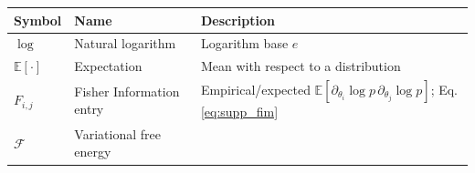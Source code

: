 \documentclass[
  10pt,
]{article}
\begin{document}
\begin{longtable}[]{@{}lll@{}}
\toprule
\begin{minipage}[b]{0.30\columnwidth}\raggedright
Symbol\strut
\end{minipage} & \begin{minipage}[b]{0.30\columnwidth}\raggedright
Name\strut
\end{minipage} & \begin{minipage}[b]{0.30\columnwidth}\raggedright
Description\strut
\end{minipage}\tabularnewline
\midrule
\endhead
\begin{minipage}[t]{0.30\columnwidth}\raggedright
\(\log\)\strut
\end{minipage} & \begin{minipage}[t]{0.30\columnwidth}\raggedright
Natural logarithm\strut
\end{minipage} & \begin{minipage}[t]{0.30\columnwidth}\raggedright
Logarithm base \(e\)\strut
\end{minipage}\tabularnewline
\begin{minipage}[t]{0.30\columnwidth}\raggedright
\(\mathbb{E}[\cdot]\)\strut
\end{minipage} & \begin{minipage}[t]{0.30\columnwidth}\raggedright
Expectation\strut
\end{minipage} & \begin{minipage}[t]{0.30\columnwidth}\raggedright
Mean with respect to a distribution\strut
\end{minipage}\tabularnewline
\begin{minipage}[t]{0.30\columnwidth}\raggedright
\(F_{i,j}\)\strut
\end{minipage} & \begin{minipage}[t]{0.30\columnwidth}\raggedright
Fisher Information entry\strut
\end{minipage} & \begin{minipage}[t]{0.30\columnwidth}\raggedright
Empirical/expected
\(\mathbb{E}[\partial_{\theta_i}\log p\,\partial_{\theta_j}\log p]\);
Eq. \eqref{eq:supp_fim}\strut
\end{minipage}\tabularnewline
\begin{minipage}[t]{0.30\columnwidth}\raggedright
\(\mathcal{F}\)\strut
\end{minipage} & \begin{minipage}[t]{0.30\columnwidth}\raggedright
Variational free energy\strut
\end{minipage} & \begin{minipage}[t]{0.30\columnwidth}\raggedright

\end{minipage}
\end{longtable}
\end{document}

